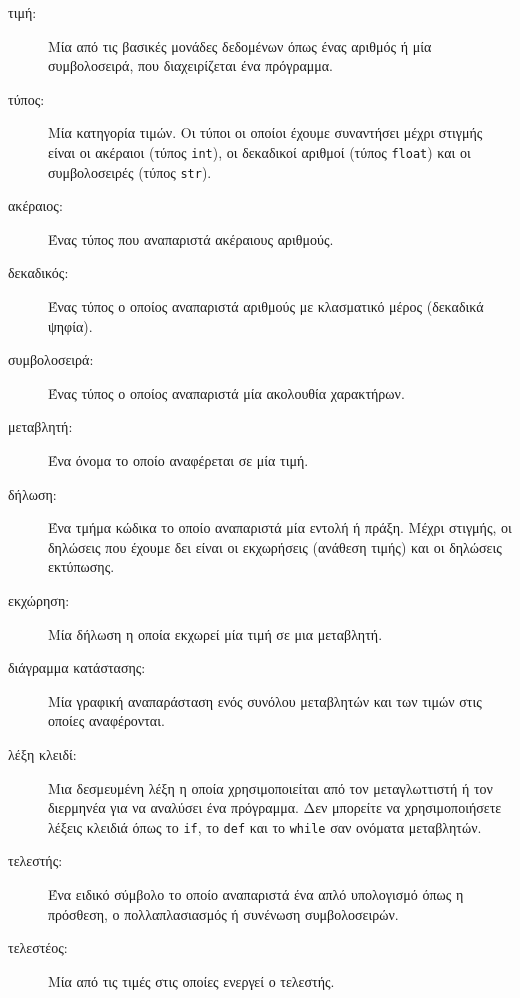 \documentclass[10pt]{book}
\begin{document}
\begin{description}

\item[τιμή:]  Μία από τις βασικές μονάδες δεδομένων όπως ένας
	αριθμός ή μία συμβολοσειρά, που διαχειρίζεται ένα πρόγραμμα.

\item[τύπος:] Μία κατηγορία τιμών. Οι τύποι οι οποίοι έχουμε συναντήσει
	μέχρι στιγμής είναι οι ακέραιοι (τύπος  {\tt int}), οι δεκαδικοί
	αριθμοί (τύπος {\tt float}) και οι συμβολοσειρές (τύπος {\tt str}).

\item[ακέραιος:] Ένας τύπος που αναπαριστά ακέραιους αριθμούς.

\item[δεκαδικός:] Ένας τύπος ο οποίος αναπαριστά αριθμούς με κλασματικό
	μέρος (δεκαδικά ψηφία).

\item[συμβολοσειρά:] Ένας τύπος ο οποίος αναπαριστά μία ακολουθία χαρακτήρων.

\item[μεταβλητή:]  Ένα όνομα το οποίο αναφέρεται σε μία τιμή.

\item[δήλωση:]  Ένα τμήμα κώδικα το οποίο αναπαριστά μία εντολή ή πράξη.  
	Μέχρι στιγμής, οι δηλώσεις που έχουμε δει είναι οι εκχωρήσεις (ανάθεση
	τιμής) και οι δηλώσεις εκτύπωσης.

\item[εκχώρηση:] Μία δήλωση η οποία εκχωρεί μία τιμή σε μια μεταβλητή.

\item[διάγραμμα κατάστασης:] Μία γραφική αναπαράσταση ενός συνόλου μεταβλητών
	και των τιμών στις οποίες αναφέρονται.

\item[λέξη κλειδί:] Μια δεσμευμένη λέξη η οποία χρησιμοποιείται από τον
	μεταγλωττιστή ή τον διερμηνέα για να αναλύσει ένα πρόγραμμα. Δεν μπορείτε
	να χρησιμοποιήσετε λέξεις κλειδιά όπως το {\tt if}, το {\tt  def} και το
    {\tt while}	σαν ονόματα μεταβλητών.

\item[τελεστής:] Ένα ειδικό σύμβολο το οποίο αναπαριστά ένα απλό υπολογισμό
    όπως η πρόσθεση, ο πολλαπλασιασμός ή συνένωση συμβολοσειρών.

\item[τελεστέος:] Μία από τις τιμές στις οποίες ενεργεί ο τελεστής.


\end{description}
\end{document}
